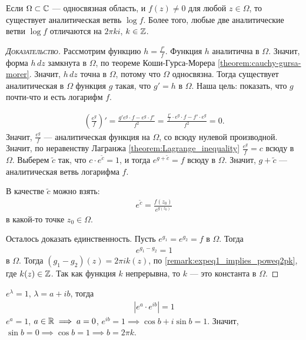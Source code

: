 \documentclass[../../main.tex]{subfiles}
\begin{document}
\begin{thm}[%
]
 Если $ \Omega \subset \mathbb{C} $ --- односвязная область, и $ f(z) \neq 0 $ для любой $ z \in \Omega $, то существует аналитическая ветвь $ \log f $. Более того, любые две аналитические ветви $ \log f $ отличаются на $ 2\pi k i $, $ k \in \mathbb{Z} $.
\end{thm}
\begin{proof}[\normalfont\textsc{Доказательство}]
 Рассмотрим функцию $h = \frac{f'}{f}$. Функция $ h $ аналитична в $ \Omega $. Значит, форма  $ h\,dz $ замкнута в  $ \Omega $, по теореме Коши-Гурса-Морера \eqref{theorem:cauchy-gursa-morer}. Значит, $ h\,dz $ точна в  $ \Omega $, потому что  $ \Omega $  односвязна. Тогда существует аналитическая в $ \Omega $  функция $ g $  такая, что $ g' = h $ в  $ \Omega $. Наша цель: показать, что $ g $  почти-что и есть логарифм $ f $.

 \begin{align*}
  \left( \frac{e^{g}}{f} \right)' = \frac{g' e^{g} \cdot f - e^{g} \cdot f'}{f^{2}} = \frac{\frac{f'}{f} \cdot e^{g} \cdot f - f' \cdot e^{g}}{f^{2}} = 0.
\end{align*} Значит, $ \frac{e^{g}}{f} $  --- аналитическая функция на $ \Omega $, со всюду нулевой производной. Значит, по неравенству Лагранжа \eqref{theorem:Lagrange_inequality} $ \frac{e^{g}}{f} = c $ всюду в $ \Omega $. Выберем $ \tilde c $ так, что $ c \cdot e^{\tilde c} = 1 $, и тогда $ e^{g+\tilde c} = f $ всюду в $ \Omega $. Значит, $ g + \tilde c $ --- аналитическая ветвь логарифма $ f $.

В качестве $\tilde c$ можно взять: 
 \begin{align*}
  e^{\tilde c} = \frac{ f(z_0)}{e^{g(z_0)}}
 \end{align*} в какой-то точке $ z_0 \in \Omega $.

 Осталось доказать единственность. Пусть $ e^{g_1} = e^{g_2} = f $ в $ \Omega $. Тогда
 \begin{align*}
  e^{g_1 - g_2} = 1
\end{align*} в $ \Omega $. Тогда $ (g_1-g_2)(z) = 2\pi i k (z) $, по \eqref{remark:expeq1_implies_poweq2pk}, где $ k(z) \in \mathbb{Z}$. Так как функция $k$ непрерывна, то $ k $ --- это константа в $ \Omega $.

\end{proof}
\begin{remrk}
  \label{remark:expeq1_implies_poweq2pk}
 $ e^{\lambda} = 1 $, $ \lambda = a + ib $, тогда
 \begin{align*}
  \left|e^{a} \cdot e^{ib} \right| = 1
 \end{align*} $ e^{a} = 1 $, $ a \in \mathbb{R} \implies a = 0 $, $ e^{ib} = 1 \implies \cos b + i \sin b = 1$. Значит, $ \sin b = 0 \implies \cos b = 1 \implies b = 2\pi k $.
\end{remrk}
\end{document}
